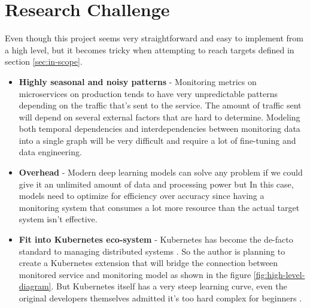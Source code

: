 {\let\clearpage\relax\chapter{Research Challenge}}

Even though this project seems very straightforward and easy to implement from a high level, but it becomes tricky when attempting to reach targets defined in section \ref{sec:in-scope}.
\\
\begin{itemize}
\item \textbf{Highly seasonal and noisy patterns} - Monitoring metrics on microservices on production tends to have very unpredictable patterns depending on the traffic that's sent to the service. The amount of traffic sent will depend on several external factors that are hard to determine. Modeling both temporal dependencies and interdependencies between monitoring data into a single graph will be very difficult and require a lot of fine-tuning and data engineering.
\item \textbf{Overhead} - Modern deep learning models can solve any problem if we could give it an unlimited amount of data and processing power but In this case, models need to optimize for efficiency over accuracy since having a monitoring system that consumes a lot more resource than the actual target system isn't effective.
\item \textbf{Fit into Kubernetes eco-system} - Kubernetes has become the de-facto standard to managing distributed systems \citep{WhatisCo78:online}. So the author is planning to create a Kubernetes extension that will bridge the connection between monitored service and monitoring model as shown in the figure \ref{fig:high-level-diagram}. But Kubernetes itself has a very steep learning curve, even the original developers themselves admitted it's too hard complex for beginners \cite{Googlead4:online}.
\end{itemize}
